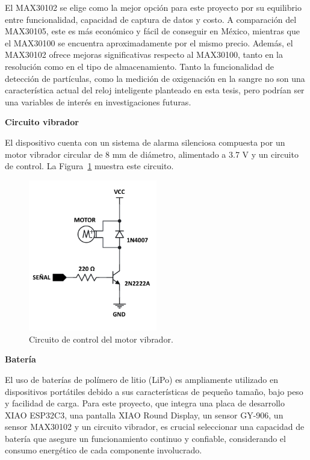 \documentclass[
  12pt,
  letterpaper,
  DIV=11,
  numbers=noendperiod]{scrreport}
\begin{document}
El MAX30102 se elige como la mejor opción para este proyecto por su
equilibrio entre funcionalidad, capacidad de captura de datos y costo. A
comparación del MAX30105, este es más económico y fácil de conseguir en
México, mientras que el MAX30100 se encuentra aproximadamente por el
mismo precio. Además, el MAX30102 ofrece mejoras significativas respecto
al MAX30100, tanto en la resolución como en el tipo de almacenamiento.
Tanto la funcionalidad de detección de partículas, como la medición de
oxigenación en la sangre no son una característica actual del reloj
inteligente planteado en esta tesis, pero podrían ser una variables de
interés en investigaciones futuras.

\textbf{Circuito vibrador}

El dispositivo cuenta con un sistema de alarma silenciosa compuesta por
un motor vibrador circular de 8 mm de diámetro, alimentado a 3.7 V y un
circuito de control. La Figura~\ref{fig-circuito_motor} muestra este
circuito.

\begin{figure}

{\centering \includegraphics[width=0.5\textwidth,height=\textheight]{Capitulos/../Imagenes/Circuito_motor.png}

}

\caption{\label{fig-circuito_motor}Circuito de control del motor
vibrador.}

\end{figure}

\textbf{Batería}

El uso de baterías de polímero de litio (LiPo) es ampliamente utilizado
en dispositivos portátiles debido a sus características de pequeño
tamaño, bajo peso y facilidad de carga. Para este proyecto, que integra
una placa de desarrollo XIAO ESP32C3, una pantalla XIAO Round Display,
un sensor GY-906, un sensor MAX30102 y un circuito vibrador, es crucial
seleccionar una capacidad de batería que asegure un funcionamiento
continuo y confiable, considerando el consumo energético de cada
componente involucrado.
\end{document}

